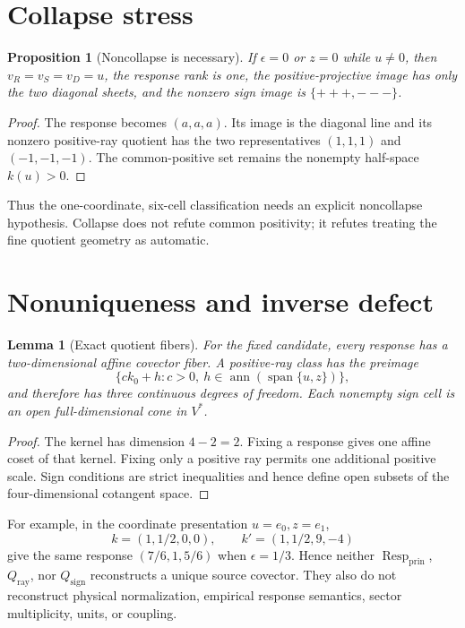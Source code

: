 \documentclass[11pt]{article}
\newtheorem{proposition}[theorem]{Proposition}
\newtheorem{lemma}[theorem]{Lemma}
\newcommand{\Resp}{\operatorname{Resp}_{\mathrm{prin}}}
\newcommand{\Qray}{Q_{\mathrm{ray}}}
\newcommand{\Qsign}{Q_{\mathrm{sign}}}
\newcommand{\ann}{\operatorname{ann}}
\begin{document}
\section{Collapse stress}

\begin{proposition}[Noncollapse is necessary]
If $\epsilon=0$ or $z=0$ while $u\ne0$, then
$v_R=v_S=v_D=u$, the response rank is one, the positive-projective image has
only the two diagonal sheets, and the nonzero sign image is
$\{+++,---\}$.
\end{proposition}

\begin{proof}
The response becomes $(a,a,a)$.  Its image is the diagonal line and its
nonzero positive-ray quotient has the two representatives $(1,1,1)$ and
$(-1,-1,-1)$.  The common-positive set remains the nonempty half-space
$k(u)>0$.
\end{proof}

Thus the one-coordinate, six-cell classification needs an explicit
noncollapse hypothesis.  Collapse does not refute common positivity; it
refutes treating the fine quotient geometry as automatic.

\section{Nonuniqueness and inverse defect}

\begin{lemma}[Exact quotient fibers]
For the fixed candidate, every response has a two-dimensional affine covector
fiber.  A positive-ray class has the preimage
\[
 \{c k_0+h:c>0,\ h\in\ann(\operatorname{span}\{u,z\})\},
\]
and therefore has three continuous degrees of freedom.  Each nonempty sign
cell is an open full-dimensional cone in $V^*$.
\end{lemma}

\begin{proof}
The kernel has dimension $4-2=2$.  Fixing a response gives one affine coset of
that kernel.  Fixing only a positive ray permits one additional positive scale.
Sign conditions are strict inequalities and hence define open subsets of the
four-dimensional cotangent space.
\end{proof}

For example, in the coordinate presentation $u=e_0,z=e_1$,
\[
 k=(1,1/2,0,0),\qquad k'=(1,1/2,9,-4)
\]
give the same response $(7/6,1,5/6)$ when $\epsilon=1/3$.  Hence neither
$\Resp$, $\Qray$, nor $\Qsign$ reconstructs a unique source covector.  They
also do not reconstruct physical normalization, empirical response semantics,
sector multiplicity, units, or coupling.
\end{document}
